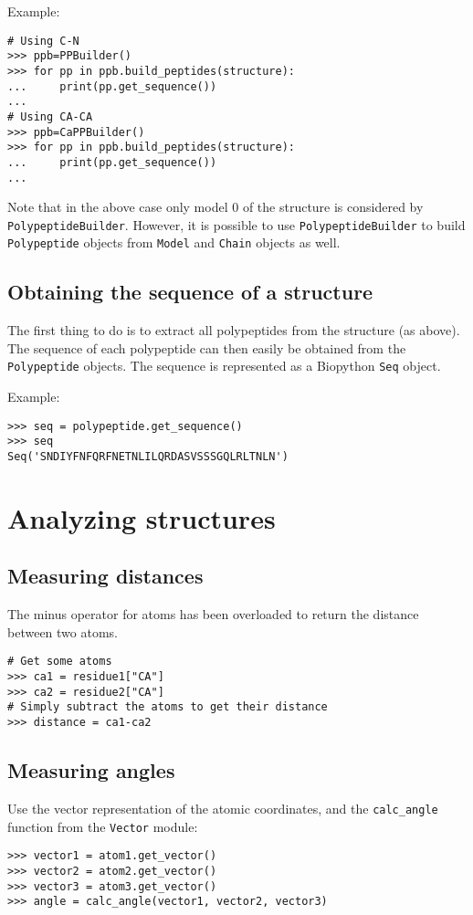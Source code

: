 Example:

\begin{verbatim}
# Using C-N
>>> ppb=PPBuilder()
>>> for pp in ppb.build_peptides(structure):
...     print(pp.get_sequence())
...
# Using CA-CA
>>> ppb=CaPPBuilder()
>>> for pp in ppb.build_peptides(structure):
...     print(pp.get_sequence())
...
\end{verbatim}
Note that in the above case only model 0 of the structure is considered
by \texttt{PolypeptideBuilder}. However, it is possible to use \texttt{PolypeptideBuilder}
to build \texttt{Polypeptide} objects from \texttt{Model} and \texttt{Chain}
objects as well.

\subsection*{Obtaining the sequence of a structure}

The first thing to do is to extract all polypeptides from the structure
(as above). The sequence of each polypeptide can then easily
be obtained from the \texttt{Polypeptide} objects. The sequence is
represented as a Biopython \texttt{Seq} object.

Example:

\begin{verbatim}
>>> seq = polypeptide.get_sequence()
>>> seq
Seq('SNDIYFNFQRFNETNLILQRDASVSSSGQLRLTNLN')
\end{verbatim}

\section{Analyzing structures}

\subsection{Measuring distances}
The minus operator for atoms has been overloaded to return the distance between two atoms.
\begin{verbatim}
# Get some atoms
>>> ca1 = residue1["CA"]
>>> ca2 = residue2["CA"]
# Simply subtract the atoms to get their distance
>>> distance = ca1-ca2
\end{verbatim}

\subsection{Measuring angles}
Use the vector representation of the atomic coordinates, and
the \texttt{calc\_angle} function from the \texttt{Vector} module:
\begin{verbatim}
>>> vector1 = atom1.get_vector()
>>> vector2 = atom2.get_vector()
>>> vector3 = atom3.get_vector()
>>> angle = calc_angle(vector1, vector2, vector3)
\end{verbatim}

